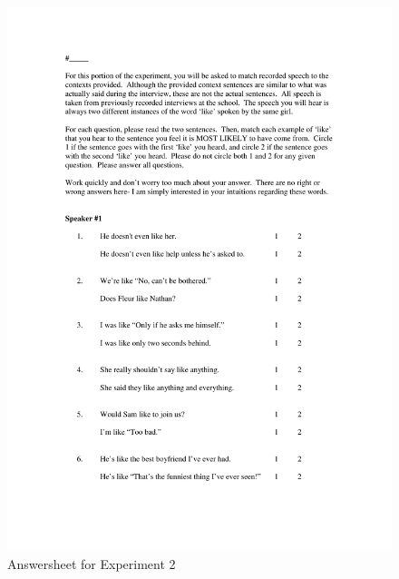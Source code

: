 \clearpage
\begin{figure}[htbp]
	\centering
		\includegraphics[width=5in]{images/Exp2page1.pdf}
		\caption{Answersheet for Experiment 2}
		\label{x2p1}
\end{figure}

